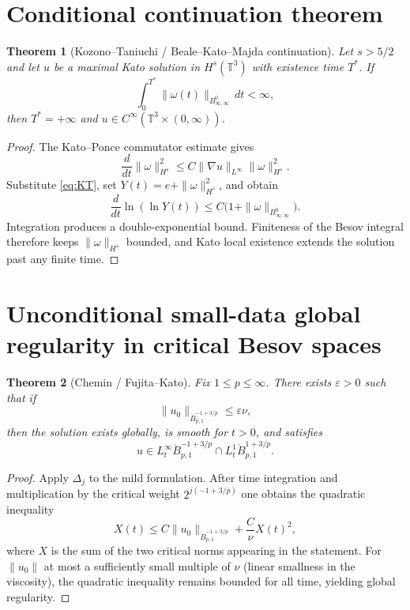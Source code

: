 \documentclass[11pt,a4paper]{article}
\newtheorem{theorem}{Theorem}[section]
\begin{document}
\section{Conditional continuation theorem}

\begin{theorem}[Kozono--Taniuchi / Beale--Kato--Majda continuation]
Let \(s>5/2\) and let \(u\) be a maximal Kato solution in \(H^s(\mathbb{T}^3)\) with existence time \(T^*\). If
\[
\int_0^{T^*}\|\omega(t)\|_{B^0_{\infty,\infty}}\,dt<\infty,
\]
then \(T^*=+\infty\) and \(u\in C^\infty(\mathbb{T}^3\times(0,\infty))\).
\end{theorem}

\begin{proof}
The Kato--Ponce commutator estimate gives
\[
\frac{d}{dt}\|\omega\|_{H^s}^2\le C\|\nabla u\|_{L^\infty}\|\omega\|_{H^s}^2.
\]
Substitute \eqref{eq:KT}, set \(Y(t)=e+\|\omega\|_{H^s}^2\), and obtain
\[
\frac{d}{dt}\ln(\ln Y(t))\le C\bigl(1+\|\omega\|_{B^0_{\infty,\infty}}\bigr).
\]
Integration produces a double-exponential bound. Finiteness of the Besov integral therefore keeps \(\|\omega\|_{H^s}\) bounded, and Kato local existence extends the solution past any finite time.
\end{proof}

\section{Unconditional small-data global regularity in critical Besov spaces}

\begin{theorem}[Chemin / Fujita--Kato]
Fix \(1\le p\le\infty\). There exists \(\varepsilon>0\) such that if
\[
\|u_0\|_{\dot{B}^{-1+3/p}_{p,1}}\le\varepsilon\nu,
\]
then the solution exists globally, is smooth for \(t>0\), and satisfies
\[
u\in L^\infty_t\dot{B}^{-1+3/p}_{p,1}\cap L^1_t\dot{B}^{1+3/p}_{p,1}.
\]
\end{theorem}

\begin{proof}
Apply \(\Delta_j\) to the mild formulation. After time integration and multiplication by the critical weight \(2^{j(-1+3/p)}\) one obtains the quadratic inequality
\[
X(t)\le C\|u_0\|_{\dot{B}^{-1+3/p}_{p,1}}+\frac{C}{\nu}X(t)^2,
\]
where \(X\) is the sum of the two critical norms appearing in the statement. For \(\|u_0\|\) at most a sufficiently small multiple of \(\nu\) (linear smallness in the viscosity), the quadratic inequality remains bounded for all time, yielding global regularity.
\end{proof}
\end{document}
